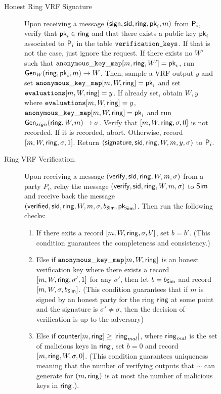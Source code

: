 \begin{figure}
\begin{tcolorbox}
{\begin{description}
	\item[Honest Ring VRF Signature] Upon receiving a message $(\mathsf{sign}, \textsf{sid}, \mathsf{ring}, \mathsf{pk}_i, m)$ from $\mathsf{P}_i$, verify that $\mathsf{pk}_i \in \mathsf{ring}$ and that there exists a public key $\mathsf{pk}_i$ associated to $\mathsf{P}_i$ in the table $ \texttt{verification\_keys} $. If that is not the case, just ignore the request. 	
	If there exists no $ W' $ such that $ \mathtt{anonymous\_key\_map}[m, \mathsf{ring},W'] =  \mathsf{pk}_i $, run $ \mathsf{Gen}_W(\mathsf{ring}, \mathsf{pk}_i, m) \rightarrow W$. Then, sample a VRF output $y$ and set $ \mathtt{anonymous\_key\_map}[m,W,\mathsf{ring}] = \mathsf{pk}_i $ and set $ \texttt{evaluations}[m, W,\mathsf{ring}] = y$.
	If already set, obtain $ W, y $ where  $ \texttt{evaluations}[m, W, \mathsf{ring}] = y$, $ \mathtt{anonymous\_key\_map}[m,W,\mathsf{ring}] =\mathsf{pk}_i $ and run  $ \mathsf{Gen}_{sign}(\mathsf{ring}, W, m) \rightarrow \sigma $. Verify that $ [m, W,\mathsf{ring}, \sigma, 0] $ is not recorded. {\color{blue}If it is recorded}, abort. 
	Otherwise, record $ [m, W, \mathsf{ring},\sigma, 1] $. Return $(\mathsf{signature}, \textsf{sid}, \mathsf{ring},W,m, y, \sigma)$ to $\mathsf{P}_i$.
	
	\item[Ring VRF Verification.] Upon receiving a message $(\mathsf{verify}, \textsf{sid}, \mathsf{ring},W, m, \sigma)$ from a party $P_i$, relay the message $(\mathsf{verify}, \textsf{sid}, \mathsf{ring},W, m, \sigma)$ to $ \mathsf{Sim} $ and receive back the message $(\mathsf{verified}, \textsf{sid}, \mathsf{ring},W, m, \sigma, b_{\mathsf{Sim}}, \mathsf{pk}_{\mathsf{Sim}})$. Then run the following checks: 
	\begin{enumerate}[label={{C}}{{\arabic*}}, start = 1]
		\item If there exits a record $ [m,W,\mathsf{ring},\sigma, b'] $, set $ b = b' $. (This condition guarantees the completeness and consistency.)
		\label{cond:consistency}
		\item Else if $ \mathtt{anonymous\_key\_map}[m,W,\mathsf{ring}]  $ is an honest verification key where  there exists a record $ [m, W,\mathsf{ring}, \sigma', 1] $ for any $ \sigma' $, then let $ b= b_{\mathsf{Sim}} $ and record $ [m, W,\sigma, b_{\mathsf{Sim}}] $. (This condition guarantees that if $ m $ is signed by an honest party for the ring $ \mathsf{ring} $ at some point and the signature is $ \sigma' \neq \sigma $, then the decision of verification is up to the adversary) \label{cond:differentsignature}
		
		\item Else if $\mathsf{counter}[m, \mathsf{ring}] \geq |\mathsf{ring}_{\mathit{mal}}|$, where $\mathsf{ring}_{\mathit{mal}}$ is the set of malicious keys in $ \mathsf{ring} $, set $ b = 0 $ and record $ [m, \mathsf{ring},W,\sigma, 0] $.
		(This condition guarantees  uniqueness meaning that the number of verifying outputs that $ \sim $ can generate for $(m, \mathsf{ring})$ 
		is at most the  number of malicious keys in $ \mathsf{ring} $.)\label{cond:uniqueness}.
		

\end{enumerate}
\end{description}}
\end{tcolorbox}
\end{figure}
